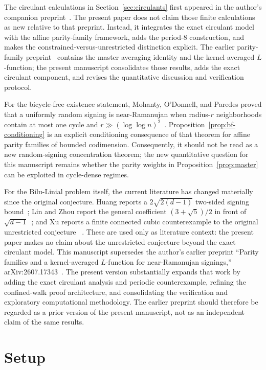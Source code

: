 \documentclass[11pt]{article}
\theoremstyle{remark}
\begin{document}
The circulant calculations in Section~\ref{sec:circulants} first appeared in the
author's companion preprint~\cite{companion}. The present paper does not claim those
finite calculations as new relative to that preprint. Instead, it integrates the exact
circulant model with the affine parity-family framework, adds the period-$8$ construction,
and makes the constrained-versus-unrestricted distinction explicit. The earlier parity-family
preprint~\cite{prior26} contains the master averaging identity and the kernel-averaged
$L$-function; the present manuscript consolidates those results, adds the exact circulant
component, and revises the quantitative discussion and verification protocol.

For the bicycle-free existence statement, Mohanty, O'Donnell, and Paredes proved that a
uniformly random signing is near-Ramanujan when radius-$r$ neighborhoods contain at most
one cycle and $r\gg(\log\log n)^2$~\cite{mop20}. Proposition~\ref{prop:bf-conditioning}
is an explicit conditioning consequence of that theorem for affine parity families of
bounded codimension. Consequently, it should not be read as a new random-signing
concentration theorem; the new quantitative question for this manuscript remains whether
the parity weights in Proposition~\ref{prop:master} can be exploited in cycle-dense regimes.

For the Bilu-Linial problem itself, the current literature has changed materially
since the original conjecture. Huang reports a $2\sqrt{2(d-1)}$ two-sided signing
bound~\cite{huang26}; Lin and Zhou report the general coefficient
$(3+\sqrt5)/2$ in front of $\sqrt{d-1}$~\cite{linzhou26}; and Xu reports a
finite connected cubic counterexample to the original unrestricted conjecture
~\cite{xu26counter}. These are used only as literature context: the present paper
makes no claim about the unrestricted conjecture beyond the exact circulant model.
This manuscript supersedes the author's earlier preprint
``Parity families and a kernel-averaged $L$-function for near-Ramanujan signings,''
arXiv:2607.17343~\cite{prior26}. The present version substantially expands
that work by adding the exact circulant analysis and periodic counterexample,
refining the confined-walk proof architecture, and consolidating the verification
and exploratory computational methodology. The earlier preprint should therefore
be regarded as a prior version of the present manuscript, not as an independent
claim of the same results.

\section{Setup}
\end{document}
